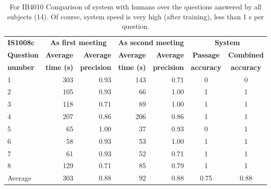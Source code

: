 \documentclass[11pt]{article}
\begin{document}
\begin{table*}
\begin{center}
\begin{tabular}{|l|rr|rr||cc|}
\hline
\textbf{IS1008c} & \multicolumn{2}{c|}{\textbf{As first meeting}} & \multicolumn{2}{c||}{\bf As second meeting} & \multicolumn{2}{c|}{\textbf{System}} 	 \\
\bf Question 	&\bf Average 	&\bf Average 		&\bf Average 	&\bf Average 		&\bf Passage &\bf Combined \\ 
\bf number 		&\bf time (s)	&\bf precision	&\bf time (s)	&\bf precision 	&\bf accuracy &\bf accuracy \\ 
\hline
1 						& 303 				& 0.93					& 143					& 0.71					& 0 & 0 \\
2 						& 105 				& 0.93					& 66					& 1.00					& 1 & 1 \\
3 						& 118 				& 0.71					& 89					& 1.00					& 1 & 1 \\
4 						& 207 				& 0.86					& 206					& 0.86					& 1 & 1 \\
5 						& 65  				& 1.00					& 37					& 0.93					& 0 & 1 \\
6 						& 58  				& 0.93					& 53					& 1.00					& 1 & 1 \\
7 						& 61  				& 0.93					& 52					& 0.71					& 1 & 1 \\
8 						& 129 				& 0.71					& 85					& 0.79					& 1 & 1 \\
\hline
Average				& 303 				& 0.88					& 92					& 0.88					& 0.75 & 0.88 \\
\hline
\end{tabular}
\end{center}
\caption{\label{tab:autobet-vs-humans-ib} For IB4010 Comparison of system with humans over the questions answered by all subjects (14).  Of course, system speed is very high (after training), less than 1 s per question.}
\end{table*}
\end{document}
